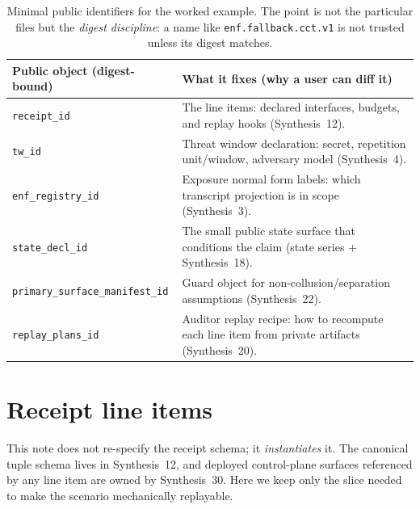 \documentclass[11pt]{article}
\begin{document}
\begin{table}[t]
\centering
\small
\begin{tabularx}{\linewidth}{@{}lX@{}}
\toprule
Public object (digest-bound) & What it fixes (why a user can diff it)\\
\midrule
\texttt{receipt\_id} & The line items: declared interfaces, budgets, and replay hooks (Synthesis~12).\\
\texttt{tw\_id} & Threat window declaration: secret, repetition unit/window, adversary model (Synthesis~4).\\
\texttt{enf\_registry\_id} & Exposure normal form labels: which transcript projection is in scope (Synthesis~3).\\
\texttt{state\_decl\_id} & The small public state surface that conditions the claim (state series + Synthesis~18).\\
\texttt{primary\_surface\_manifest\_id} & Guard object for non-collusion/separation assumptions (Synthesis~22).\\
\texttt{replay\_plans\_id} & Auditor replay recipe: how to recompute each line item from private artifacts (Synthesis~20).\\
\bottomrule
\end{tabularx}
\caption{Minimal public identifiers for the worked example. The point is not the particular files but the \emph{digest discipline}: a name like \texttt{enf.fallback.cct.v1} is not trusted unless its digest matches.}
\label{tab:min-public-ids}
\end{table}

\section{Receipt line items}
\label{sec:lineitems}
This note does not re-specify the receipt schema; it \emph{instantiates} it.
The canonical tuple schema lives in Synthesis~12, and deployed control-plane surfaces referenced by any line item are owned by Synthesis~30.\cite{series:receiptitems,series:deployedsurfaces}
Here we keep only the slice needed to make the scenario mechanically replayable.
\end{document}
